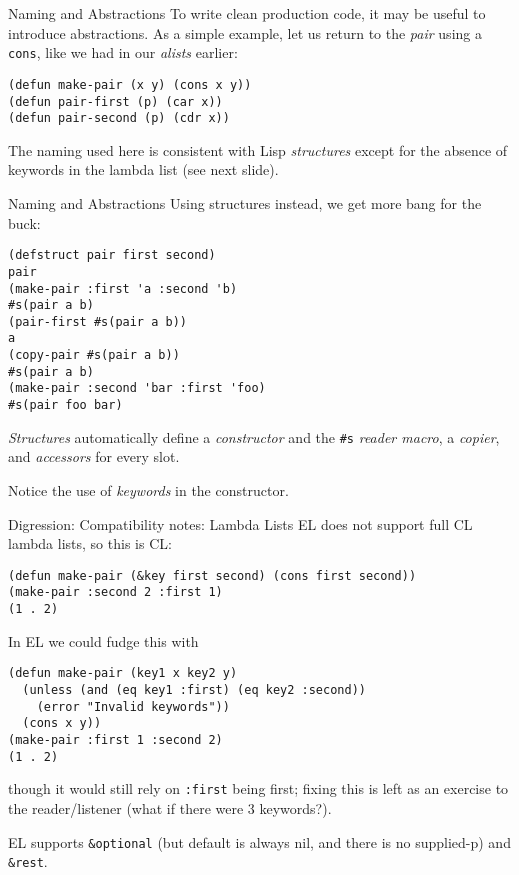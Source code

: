 \documentclass[presentation]{beamer}
\begin{document}
\begin{frame}[fragile]{Naming and Abstractions}
To write clean production code, it may be useful to introduce abstractions.  As a simple example, let us return to the \emph{pair} using a \texttt{cons}, like we had in our \emph{alists} earlier:
\begin{verbatim}
(defun make-pair (x y) (cons x y))
(defun pair-first (p) (car x))
(defun pair-second (p) (cdr x))
\end{verbatim}
The naming used here is consistent with Lisp \emph{structures} except for the absence of keywords in the lambda list (see next slide).
\end{frame}
\begin{frame}[fragile]{Naming and Abstractions}
Using structures instead, we get more bang for the buck:
\begin{verbatim}
(defstruct pair first second)
pair
(make-pair :first 'a :second 'b)
#s(pair a b)
(pair-first #s(pair a b))
a
(copy-pair #s(pair a b))
#s(pair a b)
(make-pair :second 'bar :first 'foo)
#s(pair foo bar)
\end{verbatim}
\emph{Structures} automatically define a \emph{constructor} and the \texttt{\#s} \emph{reader macro}, a \emph{copier}, and \emph{accessors} for every slot.

Notice the use of \emph{keywords} in the constructor.
\end{frame}
\begin{frame}[fragile]{Digression: Compatibility notes: Lambda Lists}
EL does not support full CL lambda lists, so this is CL:
\begin{verbatim}
(defun make-pair (&key first second) (cons first second))
(make-pair :second 2 :first 1)
(1 . 2)
\end{verbatim}
In EL we could fudge this with
\begin{verbatim}
(defun make-pair (key1 x key2 y)
  (unless (and (eq key1 :first) (eq key2 :second))
    (error "Invalid keywords"))
  (cons x y))
(make-pair :first 1 :second 2)
(1 . 2)
\end{verbatim}
though it would still rely on \texttt{:first} being first; fixing this is left as an exercise to the reader/listener (what if there were 3 keywords?).

\medskip
EL supports \texttt{\&optional} (but default is always nil, and there is no supplied-p) and \texttt{\&rest}.
\end{frame}
\end{document}
